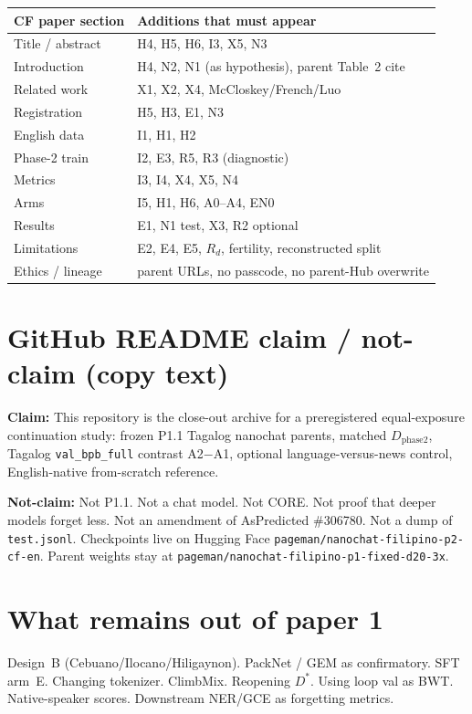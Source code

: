 \documentclass[11pt,a4paper]{article}
\begin{document}
\begin{center}
\small
\begin{tabular}{ll}
\toprule
CF paper section & Additions that must appear \\
\midrule
Title / abstract & H4, H5, H6, I3, X5, N3 \\
Introduction & H4, N2, N1 (as hypothesis), parent Table~2 cite \\
Related work & X1, X2, X4, McCloskey/French/Luo \\
Registration & H5, H3, E1, N3 \\
English data & I1, H1, H2 \\
Phase-2 train & I2, E3, R5, R3 (diagnostic) \\
Metrics & I3, I4, X4, X5, N4 \\
Arms & I5, H1, H6, A0--A4, EN0 \\
Results & E1, N1 test, X3, R2 optional \\
Limitations & E2, E4, E5, $R_d$, fertility, reconstructed split \\
Ethics / lineage & parent URLs, no passcode, no parent-Hub overwrite \\
\bottomrule
\end{tabular}
\end{center}

\section{GitHub README claim / not-claim (copy text)}
\label{sec:readme}

\textbf{Claim:} This repository is the close-out archive for a preregistered equal-exposure continuation study: frozen P1.1 Tagalog nanochat parents, matched $D_{\mathrm{phase2}}$, Tagalog \texttt{val\_bpb\_full} contrast A2$-$A1, optional language-versus-news control, English-native from-scratch reference.

\textbf{Not-claim:} Not P1.1. Not a chat model. Not CORE. Not proof that deeper models forget less. Not an amendment of AsPredicted \#306780. Not a dump of \texttt{test.jsonl}. Checkpoints live on Hugging Face \texttt{pageman/nanochat-filipino-p2-cf-en}. Parent weights stay at \texttt{pageman/nanochat-filipino-p1-fixed-d20-3x}.

\section{What remains out of paper 1}
\label{sec:out}

Design~B (Cebuano/Ilocano/Hiligaynon). PackNet / GEM as confirmatory. SFT arm~E. Changing tokenizer. ClimbMix. Reopening $D^{\ast}$. Using loop val as BWT. Native-speaker scores. Downstream NER/GCE as forgetting metrics.
\end{document}
